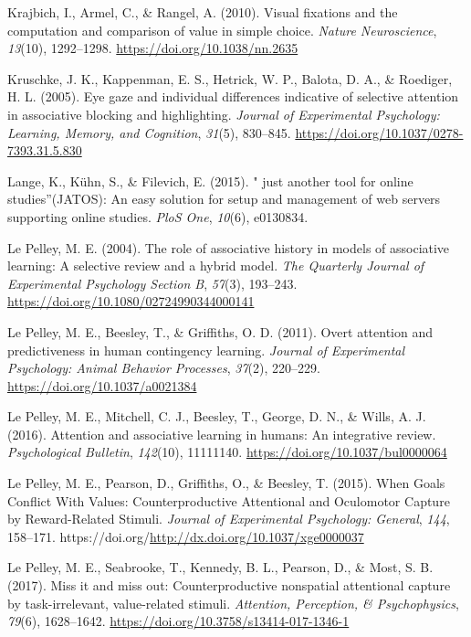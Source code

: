 \documentclass[
  man,
  floatsintext,
  longtable,
  nolmodern,
  notxfonts,
  notimes,
  mask,
  colorlinks=true,linkcolor=blue,citecolor=blue,urlcolor=blue]{apa7}
\newlength{\cslhangindent}
\newenvironment{CSLReferences}[2] %
 {\begin{list}{}{%
  \setlength{\itemindent}{0pt}
  \setlength{\leftmargin}{0pt}
  \setlength{\parsep}{0pt}
  \ifodd #1
   \setlength{\leftmargin}{\cslhangindent}
   \setlength{\itemindent}{-1\cslhangindent}
  \fi
  \setlength{\itemsep}{#2\baselineskip}}}
 {\end{list}}
\begin{document}
\begin{CSLReferences}{1}{0}
Krajbich, I., Armel, C., \& Rangel, A. (2010). Visual fixations and the
computation and comparison of value in simple choice. \emph{Nature
Neuroscience}, \emph{13}(10), 1292--1298.
\url{https://doi.org/10.1038/nn.2635}

Kruschke, J. K., Kappenman, E. S., Hetrick, W. P., Balota, D. A., \&
Roediger, H. L. (2005). Eye gaze and individual differences indicative
of selective attention in associative blocking and highlighting.
\emph{Journal of Experimental Psychology: Learning, Memory, and
Cognition}, \emph{31}(5), 830--845.
\url{https://doi.org/10.1037/0278-7393.31.5.830}

Lange, K., Kühn, S., \& Filevich, E. (2015). {"} just another tool for
online studies{''}(JATOS): An easy solution for setup and management of
web servers supporting online studies. \emph{PloS One}, \emph{10}(6),
e0130834.

Le Pelley, M. E. (2004). The role of associative history in models of
associative learning: A selective review and a hybrid model. \emph{The
Quarterly Journal of Experimental Psychology Section B}, \emph{57}(3),
193--243. \url{https://doi.org/10.1080/02724990344000141}

Le Pelley, M. E., Beesley, T., \& Griffiths, O. D. (2011). Overt
attention and predictiveness in human contingency learning.
\emph{Journal of Experimental Psychology: Animal Behavior Processes},
\emph{37}(2), 220--229. \url{https://doi.org/10.1037/a0021384}

Le Pelley, M. E., Mitchell, C. J., Beesley, T., George, D. N., \& Wills,
A. J. (2016). Attention and associative learning in humans: An
integrative review. \emph{Psychological Bulletin}, \emph{142}(10),
11111140. \url{https://doi.org/10.1037/bul0000064}

Le Pelley, M. E., Pearson, D., Griffiths, O., \& Beesley, T. (2015).
When Goals Conflict With Values: Counterproductive Attentional and
Oculomotor Capture by Reward-Related Stimuli. \emph{Journal of
Experimental Psychology: General}, \emph{144}, 158--171.
https://doi.org/\url{http://dx.doi.org/10.1037/xge0000037}

Le Pelley, M. E., Seabrooke, T., Kennedy, B. L., Pearson, D., \& Most,
S. B. (2017). Miss it and miss out: Counterproductive nonspatial
attentional capture by task-irrelevant, value-related stimuli.
\emph{Attention, Perception, \& Psychophysics}, \emph{79}(6),
1628--1642. \url{https://doi.org/10.3758/s13414-017-1346-1}


\end{CSLReferences}
\end{document}
